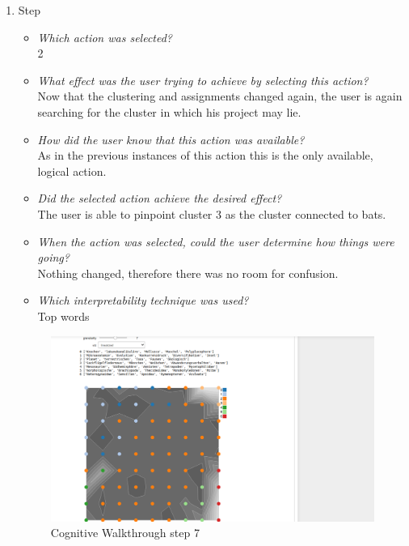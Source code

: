 {\begin{enumerate}
		\item Step
		\begin{itemize}
			\item \textit{Which action was selected?} \\
			2
			\item \textit{What effect was the user trying to achieve by selecting this action?} \\
			Now that the clustering and assignments changed again, the user is again searching for the cluster in which his project may lie. 
			\item \textit{How did the user know that this action was available?} \\
			As in the previous instances of this action this is the only available, logical action. 
			\item \textit{Did the selected action achieve the desired effect?} \\
			The user is able to pinpoint cluster 3 as the cluster connected to bats. 
			\item \textit{When the action was selected, could the user determine how things were going?} \\
			Nothing changed, therefore there was no room for confusion.
			\item \textit{Which interpretability technique was used?}\\
			Top words
		\end{itemize}
		\begin{figure}[H]
			\centering
			\includegraphics[width=400px]{../chapters/validation/pics/5_c}
			\caption{\label{pic:step7} Cognitive Walkthrough step 7}
		\end{figure} \newpage
		

\end{enumerate}}
